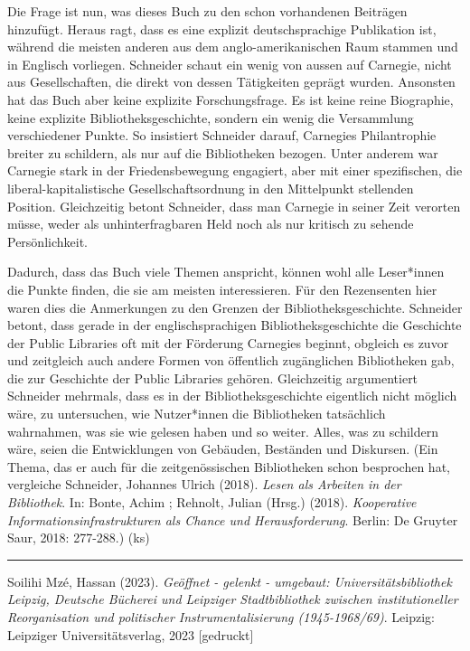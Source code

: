 \documentclass[a4paper,
fontsize=11pt,
oneside,
numbers=noperiodatend,
parskip=half-,
bibliography=totoc,
final
]{scrartcl}
\begin{document}
Die Frage ist nun, was dieses Buch zu den schon vorhandenen Beiträgen
hinzufügt. Heraus ragt, dass es eine explizit deutschsprachige
Publikation ist, während die meisten anderen aus dem
anglo-amerikanischen Raum stammen und in Englisch vorliegen. Schneider
schaut ein wenig von aussen auf Carnegie, nicht aus Gesellschaften, die
direkt von dessen Tätigkeiten geprägt wurden. Ansonsten hat das Buch
aber keine explizite Forschungsfrage. Es ist keine reine Biographie,
keine explizite Bibliotheksgeschichte, sondern ein wenig die Versammlung
verschiedener Punkte. So insistiert Schneider darauf, Carnegies
Philantrophie breiter zu schildern, als nur auf die Bibliotheken
bezogen. Unter anderem war Carnegie stark in der Friedensbewegung
engagiert, aber mit einer spezifischen, die liberal-kapitalistische
Gesellschaftsordnung in den Mittelpunkt stellenden Position.
Gleichzeitig betont Schneider, dass man Carnegie in seiner Zeit verorten
müsse, weder als unhinterfragbaren Held noch als nur kritisch zu sehende
Persönlichkeit.

Dadurch, dass das Buch viele Themen anspricht, können wohl alle
Leser*innen die Punkte finden, die sie am meisten interessieren. Für den
Rezensenten hier waren dies die Anmerkungen zu den Grenzen der
Bibliotheksgeschichte. Schneider betont, dass gerade in der
englischsprachigen Bibliotheksgeschichte die Geschichte der Public
Libraries oft mit der Förderung Carnegies beginnt, obgleich es zuvor und
zeitgleich auch andere Formen von öffentlich zugänglichen Bibliotheken
gab, die zur Geschichte der Public Libraries gehören. Gleichzeitig
argumentiert Schneider mehrmals, dass es in der Bibliotheksgeschichte
eigentlich nicht möglich wäre, zu untersuchen, wie Nutzer*innen die
Bibliotheken tatsächlich wahrnahmen, was sie wie gelesen haben und so
weiter. Alles, was zu schildern wäre, seien die Entwicklungen von
Gebäuden, Beständen und Diskursen. (Ein Thema, das er auch für die
zeitgenössischen Bibliotheken schon besprochen hat, vergleiche
Schneider, Johannes Ulrich (2018). \emph{Lesen als Arbeiten in der
Bibliothek}. In: Bonte, Achim ; Rehnolt, Julian (Hrsg.) (2018).
\emph{Kooperative Informationsinfrastrukturen als Chance und
Herausforderung}. Berlin: De Gruyter Saur, 2018: 277-288.) (ks)

\begin{center}\rule{0.5\linewidth}{0.5pt}\end{center}

Soilihi Mzé, Hassan (2023). \emph{Geöffnet - gelenkt - umgebaut:
Universitätsbibliothek Leipzig, Deutsche Bücherei und Leipziger
Stadtbibliothek zwischen institutioneller Reorganisation und politischer
Instrumentalisierung (1945-1968/69)}. Leipzig: Leipziger
Universitätsverlag, 2023 {[}gedruckt{]}
\end{document}
